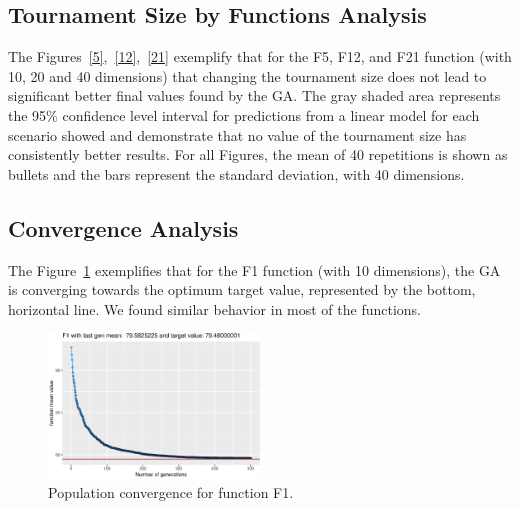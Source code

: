 \subsection{Tournament Size by Functions Analysis}
The Figures~\ref{5},~\ref{12},~\ref{21} exemplify that for the F5, F12, and F21 function (with 10, 20 and 40 dimensions) that changing the tournament size does not lead to significant better final values found by the GA. The gray shaded area represents the 95\% confidence level interval for predictions from a linear model for each scenario showed and demonstrate that no value of the tournament size has consistently better results. For all Figures, the mean of 40 repetitions is shown as bullets and the bars represent the standard deviation, with 40 dimensions. 



\subsection{Convergence Analysis}
The Figure~\ref{convegenceF1} exemplifies that for the F1 function (with 10 dimensions), the GA is converging towards the optimum target value, represented by the bottom, horizontal line. We found similar behavior in most of the functions.

\begin{figure}[t]
	\includegraphics[width=0.5\textwidth]{img/unnamed-chunk-1-1}
	\caption{Population convergence for function F1.}
	\label{convegenceF1}
\end{figure}


